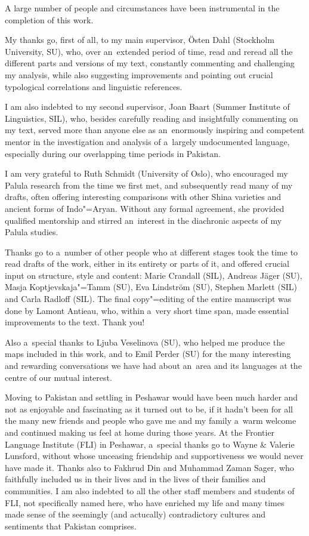 \begin{refsection}


A large number of people and circumstances have been instrumental in the completion of this work.


My thanks go, first of all, to my main supervisor, Östen Dahl (Stockholm University, SU), who, over
an~extended period of time, read and reread all the different parts and versions of my text,
constantly commenting and challenging my analysis, while also suggesting improvements and pointing
out crucial typological correlations and linguistic references.


I am also indebted to my second supervisor, Joan Baart (Summer Institute of Linguistics, SIL), who,
besides carefully reading and insightfully commenting on my text, served more than anyone else as
an~enormously inspiring and competent mentor in the investigation and analysis of a~largely
undocumented language, especially during our overlapping time periods in Pakistan.


I am very grateful to Ruth Schmidt (University of Oslo), who encouraged my Palula research from the
time we first met, and subsequently read many of my drafts, often offering interesting comparisons
with other Shina varieties and ancient forms of Indo"=Aryan. Without any formal agreement, she
provided qualified mentorship and stirred an~interest in the diachronic aspects of my Palula
studies.


Thanks go to a~number of other people who at different stages took the time to read drafts of the
work, either in its entirety or parts of it, and offered crucial input on structure, style and
content: Marie Crandall (SIL), Andreas Jäger (SU), Masja Koptjevskaja"=Tamm (SU), Eva Lindström (SU),
Stephen Marlett (SIL) and Carla Radloff (SIL). The final copy"=editing of the entire manuscript was
done by Lamont Antieau, who, within a~very short time span, made essential improvements to the
text. Thank you!


Also a~special thanks to Ljuba Veselinova (SU), who helped me produce the maps included in this
work, and to Emil Perder (SU) for the many interesting and rewarding conversations we have had about
an~area and its languages at the centre of our mutual interest.


Moving to Pakistan and settling in Peshawar would have been much harder and not as enjoyable and
fascinating as it turned out to be, if it hadn't been for all the many new friends and people who
gave me and my family a~warm welcome and continued making us feel at home during those years. At the
Frontier Language Institute (FLI) in Peshawar, a~special thanks go to Wayne \& Valerie Lunsford,
without whose unceasing friendship and supportiveness we would never have made it. Thanks also to
Fakhrud Din and Muhammad Zaman Sager, who faithfully included us in their lives and in the lives of
their families and communities. I am also indebted to all the other staff members and students of
FLI, not specifically named here, who have enriched my life and many times made sense of the
seemingly (and actucally) contradictory cultures and sentiments that Pakistan comprises.



\end{refsection}
